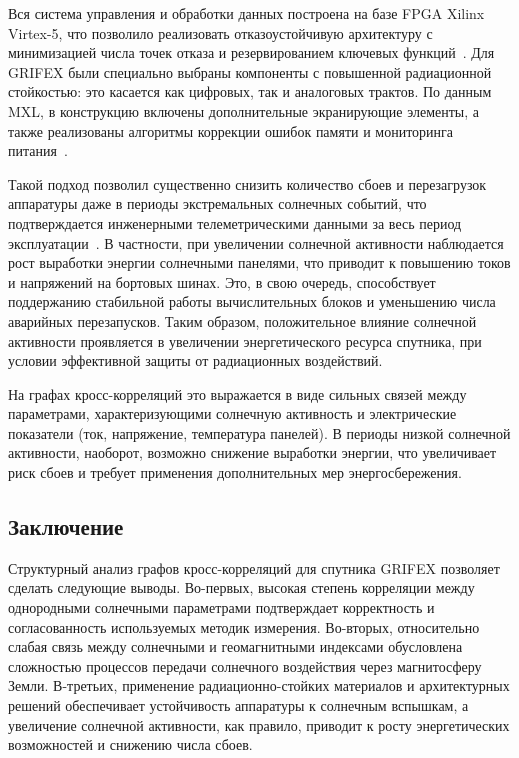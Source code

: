 Вся система управления и обработки данных построена на базе FPGA Xilinx Virtex-5, что позволило реализовать отказоустойчивую архитектуру с минимизацией числа точек отказа и резервированием ключевых функций~\cite{eoportal_grifex}. Для GRIFEX были специально выбраны компоненты с повышенной радиационной стойкостью: это касается как цифровых, так и аналоговых трактов. По данным MXL, в конструкцию включены дополнительные экранирующие элементы, а также реализованы алгоритмы коррекции ошибок памяти и мониторинга питания~\cite{mxl_grifex}.

Такой подход позволил существенно снизить количество сбоев и перезагрузок аппаратуры даже в периоды экстремальных солнечных событий, что подтверждается инженерными телеметрическими данными за весь период эксплуатации~\cite{mxl_grifex}. В частности, при увеличении солнечной активности наблюдается рост выработки энергии солнечными панелями, что приводит к повышению токов и напряжений на бортовых шинах. Это, в свою очередь, способствует поддержанию стабильной работы вычислительных блоков и уменьшению числа аварийных перезапусков. Таким образом, положительное влияние солнечной активности проявляется в увеличении энергетического ресурса спутника, при условии эффективной защиты от радиационных воздействий.

На графах кросс-корреляций это выражается в виде сильных связей между параметрами, характеризующими солнечную активность и электрические показатели (ток, напряжение, температура панелей). В периоды низкой солнечной активности, наоборот, возможно снижение выработки энергии, что увеличивает риск сбоев и требует применения дополнительных мер энергосбережения.

\subsection{Заключение}

Структурный анализ графов кросс-корреляций для спутника GRIFEX позволяет сделать следующие выводы. Во-первых, высокая степень корреляции между однородными солнечными параметрами подтверждает корректность и согласованность используемых методик измерения. Во-вторых, относительно слабая связь между солнечными и геомагнитными индексами обусловлена сложностью процессов передачи солнечного воздействия через магнитосферу Земли. В-третьих, применение радиационно-стойких материалов и архитектурных решений обеспечивает устойчивость аппаратуры к солнечным вспышкам, а увеличение солнечной активности, как правило, приводит к росту энергетических возможностей и снижению числа сбоев.

